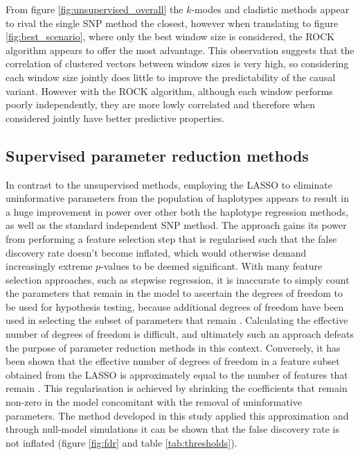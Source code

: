 From figure \ref{fig:unsupervised_overall} the $k$-modes and cladistic methods appear to rival the single SNP method the closest, however when translating to figure \ref{fig:best_scenario}, where only the best window size is considered, the ROCK algorithm appears to offer the most advantage. This observation suggests that the correlation of clustered vectors between window sizes is very high, so considering each window size jointly does little to improve the predictability of the causal variant. However with the ROCK algorithm, although each window performs poorly independently, they are more lowly correlated and therefore when considered jointly have better predictive properties. 


\subsection{Supervised parameter reduction methods}

In contrast to the unsupervised methods, employing the LASSO to eliminate uninformative parameters from the population of haplotypes appears to result in a huge improvement in power over other both the haplotype regression methods, as well as the standard independent SNP method. The approach gains its power from performing a feature selection step that is regularised such that the false discovery rate doesn't become inflated, which would otherwise demand increasingly extreme $p$-values to be deemed significant. With many feature selection approaches, such as stepwise regression, it is inaccurate to simply count the parameters that remain in the model to ascertain the degrees of freedom to be used for hypothesis testing, because additional degrees of freedom have been used in selecting the subset of parameters that remain \citep{Hastie2009}. Calculating the effective number of degrees of freedom is difficult, and ultimately such an approach defeats the purpose of parameter reduction methods in this context. Conversely, it has been shown that the effective number of degrees of freedom in a feature subset obtained from the LASSO is approximately equal to the number of features that remain \citep{Zou2007}. This regularisation is achieved by shrinking the coefficients that remain non-zero in the model concomitant with the removal of uninformative parameters. The method developed in this study applied this approximation and through null-model simulations it can be shown that the false discovery rate is not inflated (figure \ref{fig:fdr} and table \ref{tab:thresholds}). 

